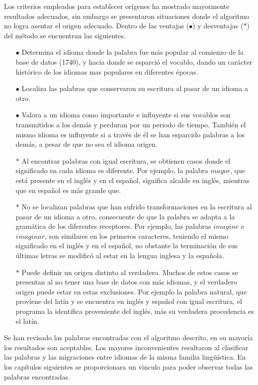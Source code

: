 Los criterios empleados para establecer orígenes ha mostrado mayormente
resultados adecuados, sin embargo se presentaron situaciones donde el algoritmo
no logra asentar el origen adecuado. Dentro de las ventajas ($\bullet$) y
desventajas ($\ast$) del método se encuentran las siguientes. 
\begin{itemize}
\item [$\bullet$] 
Determina el idioma donde la palabra fue más popular al comienzo de
la base de datos (1740), y hacia donde se esparció el vocablo, dando un
carácter histórico de los idiomas mas populares en diferentes épocas. 
\item [$\bullet$] 
Localiza las palabras que conservaron su escritura al pasar de un
idioma a otro. 
\item [$\bullet$] 
Valora a un idioma como importante e influyente si sus vocablos son
transmitidos a los demás y perduran por un periodo de tiempo. También el mismo
idioma es influyente si a través de él se han esparcido palabras a los demás, a
pesar de que no sea el idioma origen. 
\item [$\ast$] Al encontrar palabras con igual escritura, se obtienen casos donde
el significado en cada idioma es diferente.  Por ejemplo, la palabra
$\textit{mayor}$, que está presente en el inglés y en el español,  significa
alcalde en inglés, mientras que en español es más grande que.
\item [$\ast$]
No se localizan palabras que han sufrido transformaciones en la
escritura al pasar de un idioma a otro, consecuente de que la palabra se adapta
a la gramática de los diferentes receptores.  Por ejemplo, las palabras
$\textit{imagine}$ e $\textit{imaginar}$, son similares en los primeros
caracteres, teniendo el mismo significado en el inglés y en el español, no
obstante la terminación de  sus últimas letras se modificó al estar en  la
lengua inglesa y la española. 
\item [$\ast$]
 Puede definir un origen distinto al verdadero.  Muchos de estos casos se
presentan al no tener una base de datos con más idiomas, y el verdadero origen
puede estar en estas exclusiones. Por ejemplo la palabra natural, que proviene
del latín y se encuentra en inglés y español con igual escritura,  el programa
la identifica proveniente del inglés, más su verdadera procedencia es el latín. 
\end{itemize}

Se han revisado las palabras encontradas con el algoritmo descrito, en su
mayoría los resultados son aceptables. Los mayores inconvenientes resultaron al
clasificar las palabras y las migraciones entre idiomas de la misma familia
lingüística.  En los capítulos siguientes se proporcionara un vinculo para
poder observar todas las palabras encontradas.


